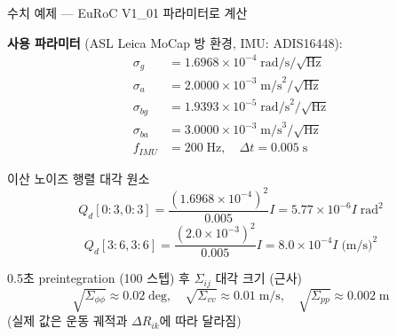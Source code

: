 \begin{frame}[shrink=10]{수치 예제 — EuRoC V1\_01 파라미터로 계산}

  \textbf{사용 파라미터} (ASL Leica MoCap 방 환경, IMU: ADIS16448):
  \begin{align*}
    \sigma_g &= 1.6968 \times 10^{-4}\;\text{rad/s}/\sqrt{\text{Hz}} \\
    \sigma_a &= 2.0000 \times 10^{-3}\;\text{m/s}^2/\sqrt{\text{Hz}} \\
    \sigma_{bg} &= 1.9393 \times 10^{-5}\;\text{rad/s}^2/\sqrt{\text{Hz}} \\
    \sigma_{ba} &= 3.0000 \times 10^{-3}\;\text{m/s}^3/\sqrt{\text{Hz}} \\
    f_{IMU} &= 200\;\text{Hz},\quad \Delta t = 0.005\;\text{s}
  \end{align*}

  \pause
  \begin{block}{이산 노이즈 행렬 대각 원소}
    \[
      Q_d[0:3,0:3] = \frac{(1.6968\times10^{-4})^2}{0.005} I
        = 5.77\times10^{-6} I\;\text{rad}^2
    \]
    \[
      Q_d[3:6,3:6] = \frac{(2.0\times10^{-3})^2}{0.005} I
        = 8.0\times10^{-4} I\;\text{(m/s)}^2
    \]
  \end{block}

  \pause
  \begin{exampleblock}{0.5초 preintegration (100 스텝) 후 $\Sigma_{ij}$ 대각 크기 (근사)}
    \[
      \sqrt{\Sigma_{\phi\phi}} \approx 0.02\;\text{deg},\quad
      \sqrt{\Sigma_{vv}} \approx 0.01\;\text{m/s},\quad
      \sqrt{\Sigma_{pp}} \approx 0.002\;\text{m}
    \]
    (실제 값은 운동 궤적과 $\Delta R_{ik}$에 따라 달라짐)
  \end{exampleblock}
\end{frame}

